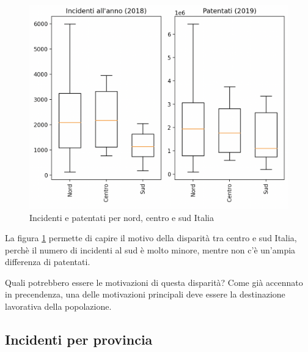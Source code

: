 \documentclass[a4paper]{report}
\begin{document}
\begin{figure}
    \includegraphics[width=\linewidth]{../src/incidenti/incidenti_aci/mappe_regioni/incidenti_patenti_box.png}
    \caption{Incidenti e patentati per nord, centro e sud Italia}
    \label{fig:incidenti-patentati-box}
\end{figure}

La figura \ref{fig:incidenti-patentati-box} permette di capire il motivo della disparità 
tra centro e sud Italia, perchè il numero di incidenti al sud è molto minore, mentre 
non c'è un'ampia differenza di patentati. 

Quali potrebbero essere le motivazioni di questa disparità?
Come già accennato in precendenza, una delle motivazioni principali 
deve essere la destinazione lavorativa della popolazione.

\subsection{Incidenti per provincia}
\end{document}
